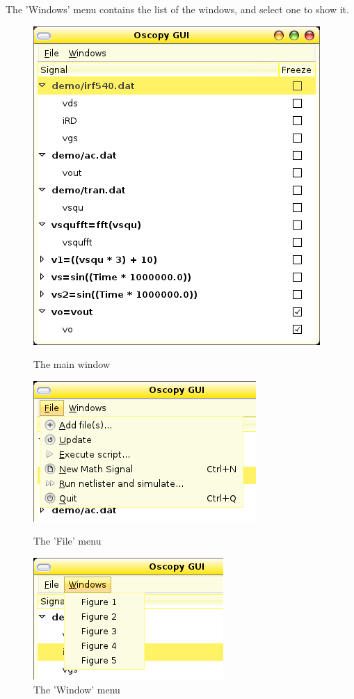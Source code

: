 \documentclass[a4paper,11pt]{article}
\begin{document}
The 'Windows' menu contains the list of the windows, and select one to show it.


\begin{figure}[htbp]
  \centering
  \includegraphics[scale=.5]{../png/ioscopy-gui.png}
  \caption{The main window}
  \label{fig:mainwin}
  \begin{minipage}{.45\linewidth}
    \includegraphics[scale=.5]{../png/ioscopy-file.png}
    \caption{The 'File' menu}
    \label{fig:filemenu}
  \end{minipage}
  \begin{minipage}{.45\linewidth}
    \includegraphics[scale=.5]{../png/ioscopy-window.png}
    \caption{The 'Window' menu}
    \label{fig:windowmenu}    
  \end{minipage}


\end{figure}
\end{document}
